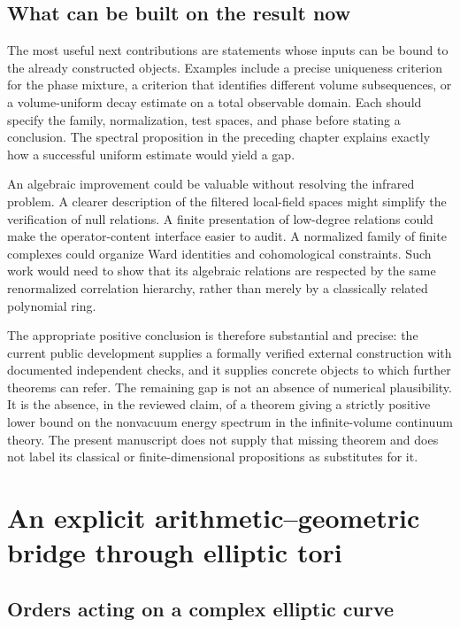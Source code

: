\section{What can be built on the result now}

The most useful next contributions are statements whose inputs can be
bound to the already constructed objects.  Examples include a precise
uniqueness criterion for the phase mixture, a criterion that identifies
different volume subsequences, or a volume-uniform decay estimate on a
total observable domain.  Each should specify the family, normalization,
test spaces, and phase before stating a conclusion.  The spectral
proposition in the preceding chapter explains exactly how a successful
uniform estimate would yield a gap.

An algebraic improvement could be valuable without resolving the infrared
problem.  A clearer description of the filtered local-field spaces might
simplify the verification of null relations.  A finite presentation of
low-degree relations could make the operator-content interface easier to
audit.  A normalized family of finite complexes could organize Ward
identities and cohomological constraints.  Such work would need to show
that its algebraic relations are respected by the same renormalized
correlation hierarchy, rather than merely by a classically related
polynomial ring.

The appropriate positive conclusion is therefore substantial and precise:
the current public development supplies a formally verified external
construction with documented independent checks, and it supplies concrete
objects to which further theorems can refer.  The remaining gap is not an
absence of numerical plausibility.  It is the absence, in the reviewed
claim, of a theorem giving a strictly positive lower bound on the
nonvacuum energy spectrum in the infinite-volume continuum theory.  The
present manuscript does not supply that missing theorem and does not label
its classical or finite-dimensional propositions as substitutes for it.

\chapter{An explicit arithmetic--geometric bridge through elliptic tori}
\label{chap:elliptic-gauge-bridge}

\section{Orders acting on a complex elliptic curve}

